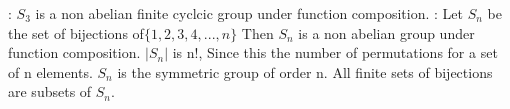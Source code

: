 \documentclass[11pt]{article}
\theoremstyle{definition}  %
\begin{document}
\theorem: $S_3$ is a non abelian finite cyclcic group under function composition.
\theorem: Let $S_n$ be the set of bijections of$\{1,2,3,4,...,n\}$ Then $S_n$ is a non abelian group under function composition.
\theorem $|S_n|$ is n!, Since this the number of permutations for a set of n elements.
\proposition $S_n$ is the symmetric group of order n. All finite sets of bijections are subsets of $S_n$.
\end{document}
